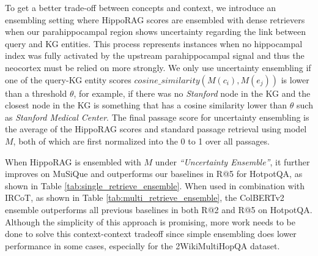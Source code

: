 \documentclass{article}
\begin{document}
\begin{appendices}
To get a better trade-off between concepts and context, we introduce an ensembling setting where HippoRAG scores are ensembled with dense retrievers when our parahippocampal region shows uncertainty regarding the link between query and KG entities. 
This process represents instances when no hippocampal index was fully activated by the upstream parahippocampal signal and thus the neocortex must be relied on more strongly.
We only use uncertainty ensembling if one of the query-KG entity scores $cosine\_similarity(M(c_i), M(e_j))$ is lower than a threshold $\theta$, for example, if there was no \textit{Stanford} node in the KG and the closest node in the KG is something that has a cosine similarity lower than $\theta$ such as \textit{Stanford Medical Center}. 
The final passage score for uncertainty ensembling is the average of the HippoRAG scores and standard passage retrieval using model $M$, both of which are first normalized into the \num{0} to \num{1} over all passages. 

When HippoRAG is ensembled with $M$ under \textit{``Uncertainty Ensemble''}, it further improves on MuSiQue and outperforms our baselines in R@5 for HotpotQA, as shown in Table \ref{tab:single_retrieve_ensemble}. When used in combination with IRCoT, as shown in Table \ref{tab:multi_retrieve_ensemble}, the ColBERTv2 ensemble outperforms all previous baselines in both R@2 and R@5 on HotpotQA.
Although the simplicity of this approach is promising, more work needs to be done to solve this context-context tradeoff since simple ensembling does lower performance in some cases, especially for the 2WikiMultiHopQA dataset.



\end{appendices}
\end{document}
